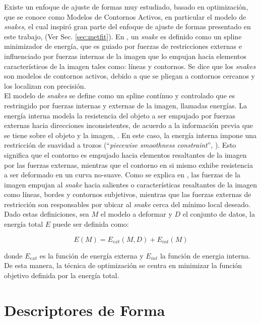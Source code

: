 Existe un enfoque de ajuste de formas muy estudiado, basado en optimizaci\'on,
que se conoce como Modelos de Contornos Activos, en particular el modelo de \emph{snakes}, 
el cual inspir\'o gran parte del enfoque de ajuste de formas presentado en este trabajo, (Ver
Sec. \ref{sec:metfit}). En \cite{snakes}, un \emph{snake} es definido como
un spline minimizador de energ\'ia, que es guiado por fuerzas de restricciones
externas e influenciado por fuerzas internas de la imagen que lo empujan
hacia elementos caracter\'isticos de la imagen tales como: l\'ineas y contornos.
Se dice que los \emph{snakes} son modelos de contornos activos, debido a que
se pliegan a contornos cercanos y los localizan con precisi\'on.\\
El modelo de \emph{snakes} se define como un spline cont\'inuo y controlado que 
es restringido por fuerzas internas y externas de la imagen, llamadas energ\'ias.
La energ\'ia interna modela la resistencia del objeto a ser empujado por fuerzas externas
hacia direcciones inconsistentes, de acuerdo a la informaci\'on previa que se tiene sobre 
el objeto y la imagen, \cite{deformable}. En este caso, la energ\'ia interna impone una
restricci\'on de suavidad a trozos (``\emph{piecewise smoothness constraint}'', \cite{snakes}).
Esto significa que el contorno es empujado hacia elementos resaltantes de la imagen por las
fuerzas externas, mientras que el contorno en si mismo exhibe resistencia a ser deformado
en un curva no-suave. Como se explica en \cite{deformable}, las fuerzas de la imagen
empujan al \emph{snake} hacia salientes o caracter\'isticas resaltantes de la imagen como l\'ineas,
bordes y contornos subjetivos, mientras que las fuerzas externas de restricci\'on son responsables
por ubicar al \emph{snake} cerca del m\'inimo local deseado.\\

Dado estas definiciones, sea $M$ el modelo a deformar y $D$ el conjunto de datos, 
la energ\'ia total $E$ puede ser definida como:

$$E(M) = E_{ext}(M,D) + E_{int}(M)$$

donde $E_{ext}$ es la funci\'on de energ\'ia externa y $E_{int}$ la funci\'on
de energia interna. De esta manera, la t\'ecnica de optimizaci\'on se centra
en minimizar la funci\'on objetivo definida por la energ\'ia total.

\section{Descriptores de Forma}
\label{sec:shapedesc}

